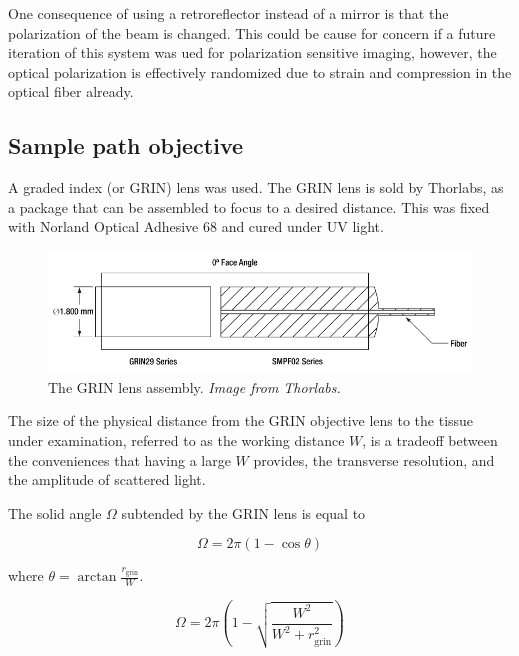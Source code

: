 One consequence of using a retroreflector instead of a mirror is that the polarization of the beam is changed. This could be cause for concern if a future iteration of this system was ued for polarization sensitive imaging, however, the optical polarization is effectively randomized due to strain and compression in the optical fiber already.

\subsection{Sample path objective}

A graded index (or GRIN) lens was used. The GRIN lens is sold by Thorlabs, as a package that can be assembled to focus to a desired distance. This was fixed with Norland Optical Adhesive 68 and cured under UV light.

\begin{figure}[h!]
\centering
\includegraphics[width=1.0\textwidth]{Images/System/grin.png}
\caption[The GRIN lens assembly.]{The GRIN lens assembly. \em{Image from Thorlabs.}}
\end{figure}

The size of the physical distance from the GRIN objective lens to the tissue under examination, referred to as the working distance $W$, is a tradeoff between the conveniences that having a large $W$ provides, the  transverse resolution, and the amplitude of scattered light.


The solid angle $\Omega$ subtended by the GRIN lens is equal to

\begin{equation}
\Omega = 2 \pi (1 - \cos{\theta})
\end{equation}

where $\theta = \arctan{\frac{r_{\mathrm{grin}}}{W}}$.

\begin{equation}
\Omega = 2 \pi \left(1 - \sqrt{\frac{W^2}{W^2 + r_{\mathrm{grin}}^2}} \right)
\end{equation}

